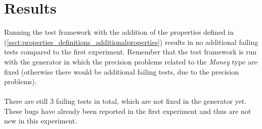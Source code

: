 \section{Results}
Running the test framework with the addition of the properties defined in
(\autoref{ssct:properties_definitions_additionalproperties}) results in no
additional failing tests compared to the first experiment. Remember that the
test framework is run with the generator in which the precision problems related
to the \textit{Money} type are fixed (otherwise there would be additional failing tests,
due to the precision problems).\\
\\
There are still 3 failing tests in total, which are not fixed in the generator
yet. These bugs have already been reported in the first experiment and thus are
not new in this experiment.

